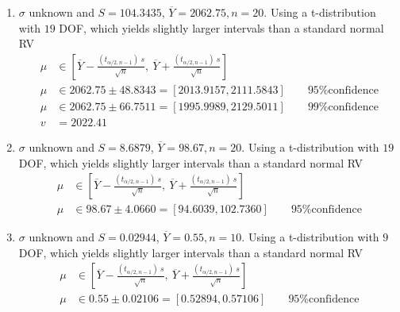 \begin{enumerate}
	\item $ \sigma $ unknown and $ S = 104.3435 $, $ \overline{Y} = 2062.75, n = 20$. Using a t-distribution with $ 19 $ DOF, which yields slightly larger intervals than a standard normal RV\\
	\begin{subequations}
		\begin{align}
			\mu &\in \left[ \overline{Y} - \frac{(t_{\alpha/2, n-1})\ s}{\sqrt{n}}, \ \overline{Y} + \frac{(t_{\alpha/2, n-1})\ s}{\sqrt{n}} \right] \nonumber \\
			\mu &\in 2062.75 \pm 48.8343 = [2013.9157, 2111.5843] \qquad \text{95\% confidence} \nonumber \\
			\mu &\in 2062.75 \pm 66.7511 = [1995.9989, 2129.5011] \qquad \text{99\% confidence} \nonumber \\
			v &= 2022.41
		\end{align}
	\end{subequations}

	\item $ \sigma $ unknown and $ S = 8.6879 $, $ \overline{Y} = 98.67, n = 20$. Using a t-distribution with $ 19 $ DOF, which yields slightly larger intervals than a standard normal RV\\
	\begin{subequations}
		\begin{align}
			\mu &\in \left[ \overline{Y} - \frac{(t_{\alpha/2, n-1})\ s}{\sqrt{n}}, \ \overline{Y} + \frac{(t_{\alpha/2, n-1})\ s}{\sqrt{n}} \right] \nonumber \\
			\mu &\in 98.67 \pm 4.0660 = [94.6039, 102.7360] \qquad \text{95\% confidence} 
		\end{align}
	\end{subequations}

	\item $ \sigma $ unknown and $ S = 0.02944 $, $ \overline{Y} = 0.55, n = 10$. Using a t-distribution with $ 9 $ DOF, which yields slightly larger intervals than a standard normal RV\\
	\begin{subequations}
		\begin{align}
			\mu &\in \left[ \overline{Y} - \frac{(t_{\alpha/2, n-1})\ s}{\sqrt{n}}, \ \overline{Y} + \frac{(t_{\alpha/2, n-1})\ s}{\sqrt{n}} \right] \nonumber \\
			\mu &\in 0.55 \pm 0.02106 = [0.52894, 0.57106] \qquad \text{95\% confidence} 
		\end{align}
	\end{subequations}


\end{enumerate}
